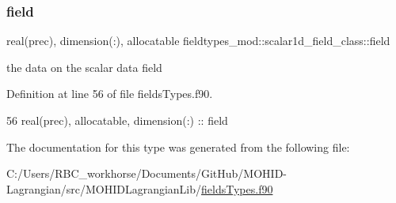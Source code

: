 \subsubsection{\texorpdfstring{field}{field}}
{\footnotesize\ttfamily real(prec), dimension(\+:), allocatable fieldtypes\+\_\+mod\+::scalar1d\+\_\+field\+\_\+class\+::field\hspace{0.3cm}{\ttfamily [private]}}



the data on the scalar data field 



Definition at line 56 of file fields\+Types.\+f90.


\begin{DoxyCode}
56         \textcolor{keywordtype}{real(prec)}, \textcolor{keywordtype}{allocatable}, \textcolor{keywordtype}{dimension(:)} :: field
\end{DoxyCode}


The documentation for this type was generated from the following file\+:\begin{DoxyCompactItemize}
\item 
C\+:/\+Users/\+R\+B\+C\+\_\+workhorse/\+Documents/\+Git\+Hub/\+M\+O\+H\+I\+D-\/\+Lagrangian/src/\+M\+O\+H\+I\+D\+Lagrangian\+Lib/\mbox{\hyperlink{fields_types_8f90}{fields\+Types.\+f90}}\end{DoxyCompactItemize}
